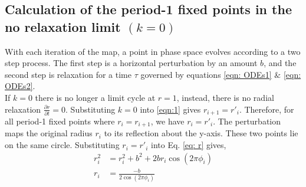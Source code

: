 \subsection{Calculation of the period-1 fixed points in the no relaxation limit $(k=0)$} 
With each iteration of the map, a point in phase space evolves according to a two step process. The first step is a horizontal perturbation by an amount $b$, and the second step is relaxation for a time $\tau$ governed by equations \ref{eqn: ODEs1} $\&$ \ref{eqn: ODEs2}.\\

If $k=0$ there is no longer a limit cycle at $r=1$, instead, there is no radial relaxation $\frac{\partial r}{\partial t} = 0$. Substituting $k=0$ into \ref{eqn:1} gives $r_{i+1}=r'_i$. Therefore, for all period-1 fixed points where $r_i = r_{i+1}$, we have $r_i = r'_i$. The perturbation maps the original radius $r_i$ to its reflection about the y-axis. These two points lie on the same circle. Substituting $r_i = r'_i$ into Eq. \ref{eq: r} gives,
\begin{align}
r_i^2 & = r_i^2 + b^2 + 2br_i\cos(2\pi\phi_i) \nonumber \\
r_i & = \frac{-b}{2\cos(2\pi\phi_i)} \label{eq: k0 r}
\end{align}

